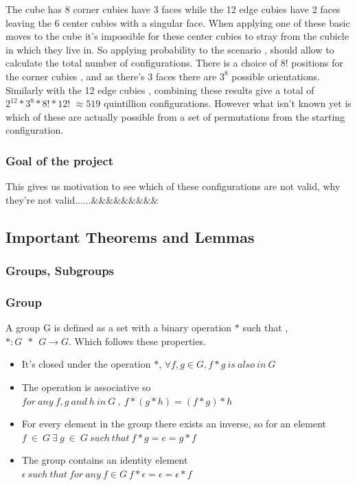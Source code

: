 \documentclass{article}
\begin{document}
The cube has 8 corner cubies have 3 faces while the 12 edge cubies have 2 faces leaving the 6 center cubies with a singular face. When applying one of these basic moves to the cube it's impossible for these center cubies to stray from the cubicle in which they live in.
So applying probability to the scenario , should allow to calculate the total number of configurations.
There is a choice of 8! positions for the corner cubies , and as there's 3 faces there are $3^8$ possible orientations. Similarly with the 12 edge cubies , combining these results give a total of $2^{12} * 3^8 * 8! * 12!$ $\approx 519$ quintillion configurations.
However what isn't known yet is which of these are actually possible from a set of permutations from the starting configuration.

\subsubsection*{Goal of the project}

This gives us motivation to see which of these configurations are not valid, why they're not valid......$\&\&\&\&\&\&\&\&\&$

\paragraph*{}


\subsection*{Important Theorems and Lemmas}

\paragraph*{}
\subsubsection*{Groups, Subgroups}

\subsubsection*{Group}
 
A group G is defined as a set with a binary operation $*$ such that , $* : G \ \ *\ \ G \rightarrow G$.
Which follows these properties.
\begin{itemize}
	\item It's closed under the operation $*$,  $\forall f, g \in G , f*g\ is\ also\ in \ G$
    \item The operation is associative so $for\ any\ f, g\ and\  h\ in\  G\ ,\  f*(g*h) = (f*g)*h$
    \item For every element in the group there exists an inverse, so for an element $ f\ \in\ G\ \exists\ g\ \in\ G\ such\ that\ f*g=e=g*f$
    \item The group contains an identity element $\epsilon \ such\ that\ for\ any\ f \in G\ f*\epsilon=\epsilon=\epsilon *f$
\end{itemize}
\end{document}
